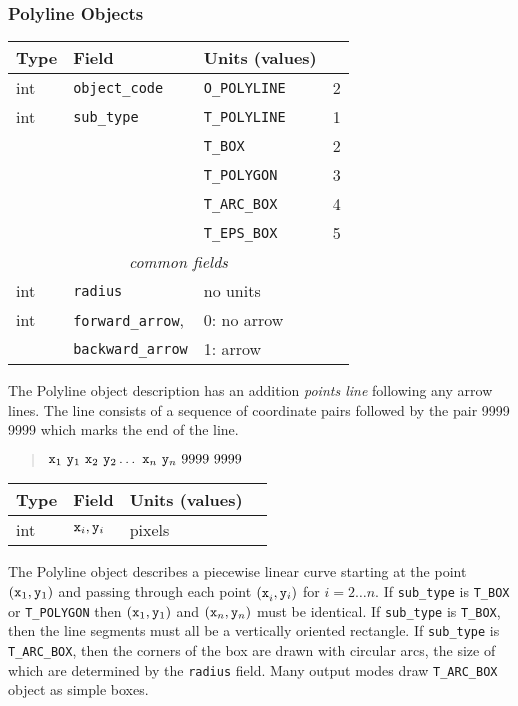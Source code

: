 \subsubsection{Polyline Objects}
%
\begin{center}
\begin{tabular} {|l|l|ll|}
\hline
Type	& Field			& Units (values)	&	\\ \hline
\hline
%
int	& {\tt object\_code} 	& {\tt O\_POLYLINE}	& 2	 \\ \hline
%
int	& {\tt sub\_type}	& {\tt T\_POLYLINE}	& 1	\\
	&			& {\tt T\_BOX}		& 2	\\
	&			& {\tt T\_POLYGON}	& 3	\\
	&                       & {\tt T\_ARC\_BOX}   	& 4	\\ \hline
	&                       & {\tt T\_EPS\_BOX}   	& 5	\\ \hline
%
\multicolumn{4}{c}{\it common fields}				\\ \hline
%
int	& {\tt radius}		& no units		& 	\\
int	& {\tt forward\_arrow},	& 0: no arrow		&	\\
	& {\tt backward\_arrow}	& 1: arrow		&	\\ \hline
\end{tabular}
\end{center}
%
The Polyline object description has an addition {\em points line} following
	any arrow lines.
The line consists of a sequence of coordinate pairs followed by the
	pair 9999 9999 which marks the end of the line.
%
\begin{quote}
$
	 {\tt x}_1 ~{\tt y}_1 ~{\tt x}_2 ~{\tt y}_2 \ldots
	~{\tt x}_n ~{\tt y}_n ~9999 ~9999
$
\end{quote}
%
\begin{center}
\begin{tabular} {|l|l|ll|}
\hline
Type	& Field			& Units (values)	&	\\ \hline
\hline
%
int	& ${\tt x}_i, {\tt y}_i$& pixels		&	\\ \hline
\end{tabular}
\end{center}

The Polyline object describes a piecewise linear curve starting at
	the point $({\tt x}_1, {\tt y}_1)$ and passing through 
	each point ${(\tt x}_i, {\tt y}_i)$ for $i = 2 \ldots n$.
If {\tt sub\_type} is {\tt T\_BOX} or {\tt T\_POLYGON} then 
	$({\tt x}_1, {\tt y}_1)$ and $({\tt x}_n, {\tt y}_n)$ must
	be identical.
If {\tt sub\_type} is {\tt T\_BOX}, then the line segments must all be
	a vertically oriented rectangle.
If {\tt sub\_type} is {\tt T\_ARC\_BOX}, then the corners of the box are
	drawn with circular arcs, the size of which are determined by
	the {\tt radius} field.
Many output modes draw {\tt T\_ARC\_BOX} object as simple boxes.


